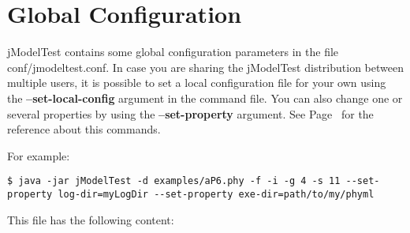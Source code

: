 \section{Global Configuration}
\label{sec:config}

jModelTest contains some global configuration parameters in the file conf/jmodeltest.conf. In case you are sharing the jModelTest distribution between multiple users, it is possible to set a local configuration file for your own using the {\bf --set-local-config} argument in the command file. You can also change one or several properties by using the {\bf --set-property} argument. See Page~\pageref{pp:args-config} for the reference about this commands.

For example:
\begin{lstlisting}
$ java -jar jModelTest -d examples/aP6.phy -f -i -g 4 -s 11 --set-property log-dir=myLogDir --set-property exe-dir=path/to/my/phyml
\end{lstlisting}

This file has the following content:

